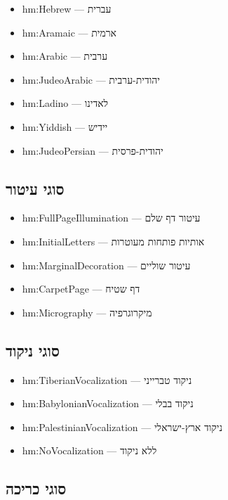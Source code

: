 \documentclass[12pt,a4paper]{article}
\begin{document}
\begin{itemize}
\item hm:Hebrew — עברית
\item hm:Aramaic — ארמית
\item hm:Arabic — ערבית
\item hm:JudeoArabic — יהודית-ערבית
\item hm:Ladino — לאדינו
\item hm:Yiddish — יידיש
\item hm:JudeoPersian — יהודית-פרסית
\end{itemize}

\subsection{סוגי עיטור}

\begin{itemize}
\item hm:FullPageIllumination — עיטור דף שלם
\item hm:InitialLetters — אותיות פותחות מעוטרות
\item hm:MarginalDecoration — עיטור שוליים
\item hm:CarpetPage — דף שטיח
\item hm:Micrography — מיקרוגרפיה
\end{itemize}

\subsection{סוגי ניקוד}

\begin{itemize}
\item hm:TiberianVocalization — ניקוד טברייני
\item hm:BabylonianVocalization — ניקוד בבלי
\item hm:PalestinianVocalization — ניקוד ארץ-ישראלי
\item hm:NoVocalization — ללא ניקוד
\end{itemize}

\subsection{סוגי כריכה}
\end{document}
